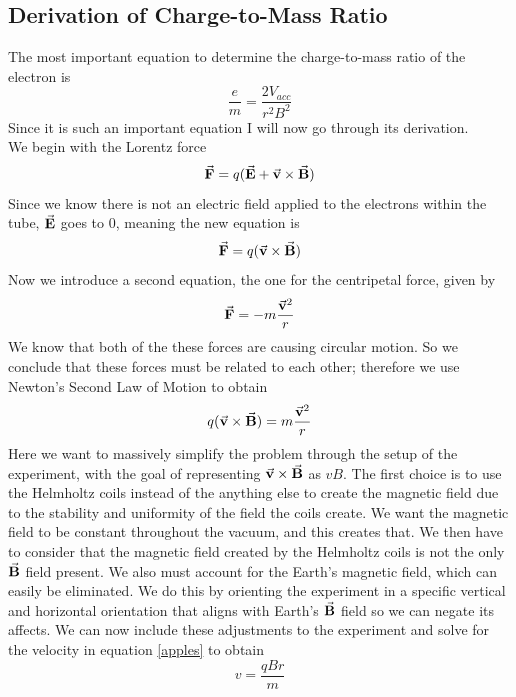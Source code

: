 \documentclass[aps,prl,10pt,twocolumn,floatfix]{revtex4-2}
\begin{document}
\subsection{Derivation of Charge-to-Mass Ratio}
The most important equation to determine the charge-to-mass ratio of the electron is
\begin{equation}\label{pears}
\frac{e}{m}=\frac{2V_{acc}}{r^2B^2}
\end{equation}
Since it is such an important equation I will now go through its derivation. \\
We begin with the Lorentz force
\begin{equation}
\va{F}=q(\va{E}+\va{v}\times \va{B})
\end{equation}
Since we know there is not an electric field applied to the electrons within the tube, $\va{E}$ goes to 0, meaning the new equation is
\begin{equation*}
\va{F}=q(\va{v}\times \va{B})
\end{equation*}
Now we introduce a second equation, the one for the centripetal force, given by
\begin{equation*}
\va{F}=-m\frac{\va{v}^2}{r}
\end{equation*}
We know that both of the these forces are causing circular motion.
So we conclude that these forces must be related to each other;
therefore we use Newton's Second Law of Motion to obtain
\begin{equation}\label{apples}
q(\va{v}\times \va{B})=m\frac{\va{v}^2}{r}
\end{equation}
Here we want to massively simplify the problem through the setup of the experiment, with the goal of representing $\va{v}\times \va{B}$ as $vB$.
The first choice is to use the Helmholtz coils instead of the anything else to create the magnetic field due to the stability and uniformity of the field the coils create.
We want the magnetic field to be constant throughout the vacuum, and this creates that.
We then have to consider that the magnetic field created by the Helmholtz coils is not the only $\va{B}$ field present.
We also must account for the Earth's magnetic field, which can easily be eliminated.
We do this by orienting the experiment in a specific vertical and horizontal orientation that aligns with Earth's $\va{B}$ field so we can negate its affects.
We can now include these adjustments to the experiment and solve for the velocity in equation \ref{apples} to obtain
\begin{equation}\label{oranges}
v=\frac{qBr}{m}
\end{equation}
\end{document}
